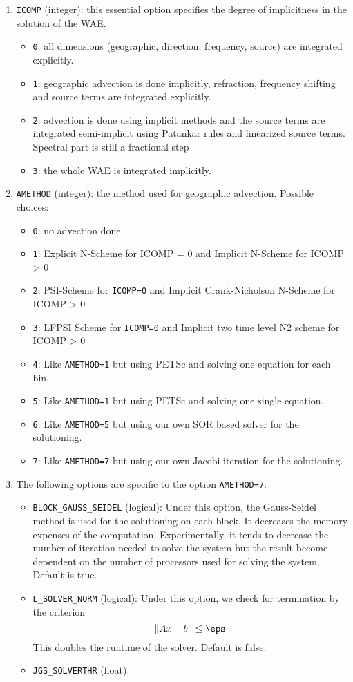\documentclass[12pt]{amsart}
\begin{document}
\begin{enumerate}
\item {\tt ICOMP} (integer): this essential option specifies the degree of implicitness in the solution of the WAE.
  \begin{itemize}
  \item {\tt 0}: all dimensions (geographic, direction, frequency, source) are integrated explicitly.
  \item {\tt 1}: geographic advection is done implicitly, refraction, frequency shifting and source terms are integrated explicitly.
  \item {\tt 2}: advection is done using implicit methods and the source terms are integrated semi-implicit using Patankar rules and linearized source terms. Spectral part is still a fractional step
  \item {\tt 3}: the whole WAE is integrated implicitly.
  \end{itemize}
\item {\tt AMETHOD} (integer): the method used for geographic advection. Possible choices:
  \begin{itemize}
  \item {\tt 0}: no advection done
  \item {\tt 1}: Explicit N-Scheme for ICOMP = 0 and Implicit N-Scheme for ICOMP > 0
  \item {\tt 2}: PSI-Scheme for {\tt ICOMP=0} and Implicit Crank-Nicholson N-Scheme for ICOMP > 0
  \item {\tt 3}: LFPSI Scheme for {\tt ICOMP=0} and Implicit two time level N2 scheme for ICOMP > 0
  \item {\tt 4}: Like {\tt AMETHOD=1} but using PETSc and solving one equation for each bin.
  \item {\tt 5}: Like {\tt AMETHOD=1} but using PETSc and solving one single equation.
  \item {\tt 6}: Like {\tt AMETHOD=5} but using our own SOR based solver for the solutioning.
  \item {\tt 7}: Like {\tt AMETHOD=7} but using our own Jacobi iteration for the solutioning.
  \end{itemize}
\item The following options are specific to the option {\tt AMETHOD=7}:
  \begin{itemize}
  \item {\tt BLOCK\_GAUSS\_SEIDEL} (logical): Under this option, the Gauss-Seidel method is used for the solutioning on each block. It decreases the memory expenses of the computation. Experimentally, it tends to decrease the number of iteration needed to solve the system but the result become dependent on the number of processors used for solving the system. Default is true.
  \item {\tt L\_SOLVER\_NORM} (logical): Under this option, we check for termination by the criterion
  \begin{equation*}
  \Vert Ax - b\Vert \leq \eps
  \end{equation*}
  This doubles the runtime of the solver. Default is false.
  \item {\tt JGS\_SOLVERTHR} (float): 
    



\end{itemize}
\end{enumerate}
\end{document}

